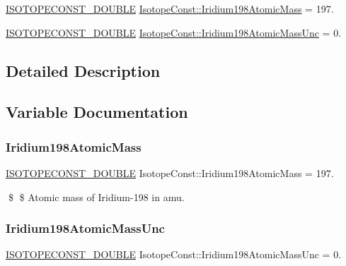 \begin{DoxyCompactItemize}
\item 
\mbox{\hyperlink{group___isotope_const-_macros_ga8f45a7272ce02c0b4c65c44636ed719a}{I\+S\+O\+T\+O\+P\+E\+C\+O\+N\+S\+T\+\_\+\+D\+O\+U\+B\+LE}} \mbox{\hyperlink{group___isotope_const-_iridium-_ir198_ga6d3693d5d6812394e898e17e6bce5d7e}{Isotope\+Const\+::\+Iridium198\+Atomic\+Mass}} = 197.
\item 
\mbox{\hyperlink{group___isotope_const-_macros_ga8f45a7272ce02c0b4c65c44636ed719a}{I\+S\+O\+T\+O\+P\+E\+C\+O\+N\+S\+T\+\_\+\+D\+O\+U\+B\+LE}} \mbox{\hyperlink{group___isotope_const-_iridium-_ir198_gaa37b5ddf6028804f57bce2ee8059a38d}{Isotope\+Const\+::\+Iridium198\+Atomic\+Mass\+Unc}} = 0.
\end{DoxyCompactItemize}


\subsection{Detailed Description}


\subsection{Variable Documentation}
\mbox{\label{group___isotope_const-_iridium-_ir198_ga6d3693d5d6812394e898e17e6bce5d7e}} 
\subsubsection{\texorpdfstring{Iridium198\+Atomic\+Mass}{Iridium198AtomicMass}}
{\footnotesize\ttfamily \mbox{\hyperlink{group___isotope_const-_macros_ga8f45a7272ce02c0b4c65c44636ed719a}{I\+S\+O\+T\+O\+P\+E\+C\+O\+N\+S\+T\+\_\+\+D\+O\+U\+B\+LE}} Isotope\+Const\+::\+Iridium198\+Atomic\+Mass = 197.}

\$ \$ Atomic mass of Iridium-\/198 in amu. \mbox{\label{group___isotope_const-_iridium-_ir198_gaa37b5ddf6028804f57bce2ee8059a38d}} 
\subsubsection{\texorpdfstring{Iridium198\+Atomic\+Mass\+Unc}{Iridium198AtomicMassUnc}}
{\footnotesize\ttfamily \mbox{\hyperlink{group___isotope_const-_macros_ga8f45a7272ce02c0b4c65c44636ed719a}{I\+S\+O\+T\+O\+P\+E\+C\+O\+N\+S\+T\+\_\+\+D\+O\+U\+B\+LE}} Isotope\+Const\+::\+Iridium198\+Atomic\+Mass\+Unc = 0.}

